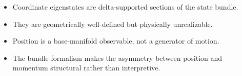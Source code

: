 \documentclass[11pt]{article}
\begin{document}
\begin{itemize}
\item Coordinate eigenstates are delta-supported sections of the state bundle.
\item They are geometrically well-defined but physically unrealizable.
\item Position is a base-manifold observable, not a generator of motion.
\item The bundle formalism makes the asymmetry between position and momentum
structural rather than interpretive.
\end{itemize}
\end{document}
